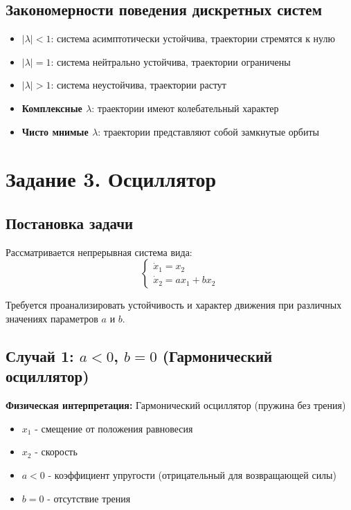 \subsection*{Закономерности поведения дискретных систем}

\begin{itemize}
    \item \textbf{$|\lambda| < 1$}: система асимптотически устойчива, траектории стремятся к нулю
    \item \textbf{$|\lambda| = 1$}: система нейтрально устойчива, траектории ограничены
    \item \textbf{$|\lambda| > 1$}: система неустойчива, траектории растут
    \item \textbf{Комплексные $\lambda$}: траектории имеют колебательный характер
    \item \textbf{Чисто мнимые $\lambda$}: траектории представляют собой замкнутые орбиты
\end{itemize}

\section*{Задание 3. Осциллятор}

\subsection*{Постановка задачи}

Рассматривается непрерывная система вида:
\begin{equation}
\begin{cases}
\dot{x}_1 = x_2 \\
\dot{x}_2 = ax_1 + bx_2
\end{cases}
\end{equation}

Требуется проанализировать устойчивость и характер движения при различных значениях параметров $a$ и $b$.

\subsection*{Случай 1: $a < 0$, $b = 0$ (Гармонический осциллятор)}

\textbf{Физическая интерпретация:} Гармонический осциллятор (пружина без трения)

\begin{itemize}
    \item $x_1$ - смещение от положения равновесия
    \item $x_2$ - скорость
    \item $a < 0$ - коэффициент упругости (отрицательный для возвращающей силы)
    \item $b = 0$ - отсутствие трения
\end{itemize}

